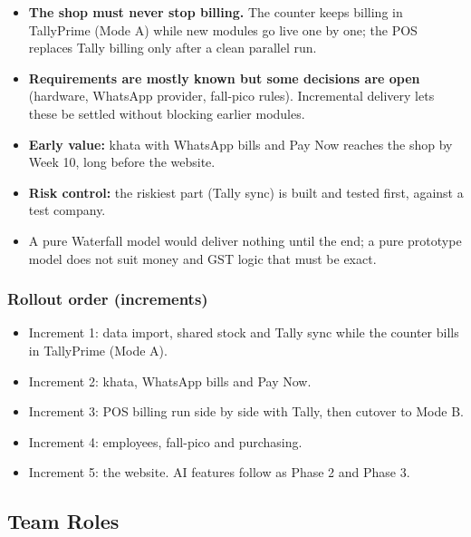 \documentclass[12pt,a4paper]{article}
\begin{document}
\begin{itemize}
\item
  \textbf{The shop must never stop billing.} The counter keeps billing
  in TallyPrime (Mode A) while new modules go live one by one; the POS
  replaces Tally billing only after a clean parallel run.
\item
  \textbf{Requirements are mostly known but some decisions are open}
  (hardware, WhatsApp provider, fall-pico rules). Incremental delivery
  lets these be settled without blocking earlier modules.
\item
  \textbf{Early value:} khata with WhatsApp bills and Pay Now reaches
  the shop by Week 10, long before the website.
\item
  \textbf{Risk control:} the riskiest part (Tally sync) is built and
  tested first, against a test company.
\item
  A pure Waterfall model would deliver nothing until the end; a pure
  prototype model does not suit money and GST logic that must be exact.
\end{itemize}

\subsubsection{Rollout order
(increments)}\label{rollout-order-increments}

\begin{itemize}
\item
  Increment 1: data import, shared stock and Tally sync while the
  counter bills in TallyPrime (Mode A).
\item
  Increment 2: khata, WhatsApp bills and Pay Now.
\item
  Increment 3: POS billing run side by side with Tally, then cutover to
  Mode B.
\item
  Increment 4: employees, fall-pico and purchasing.
\item
  Increment 5: the website. AI features follow as Phase 2 and Phase 3.
\end{itemize}

\subsection{Team Roles}\label{team-roles}
\end{document}
